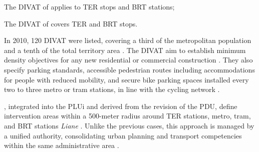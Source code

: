 \begin{refsegment}
{\begin{customitemize}
    \item The \acrshort{DIVAT} of  applies to  \acrshort{TER} stops and  \acrshort{BRT} stations;
    \item The \acrshort{DIVAT} of  covers  \acrshort{TER} and \acrshort{BRT} stops.
        \end{customitemize}
    In 2010, 120 \acrshort{DIVAT} were listed, covering a third of the metropolitan population and a tenth of the total territory area \textcolor{blue}{\autocite[18]{cerema_articuler_2010}}. The \acrshort{DIVAT} aim to establish minimum density objectives for any new residential or commercial construction \textcolor{blue}{\autocite[19]{lmcu_plan_2011}}. They also specify parking standards, accessible pedestrian routes including accommodations for people with reduced mobility, and secure bike parking spaces installed every two to three metro or tram stations, in line with the cycling network \textcolor{blue}{\autocite[19]{lmcu_plan_2011}}.
}, integrated into the \acrfull{PLUi} and derived from the revision of the \acrshort{PDU}, define intervention areas within a 500-meter radius around \acrshort{TER} stations, metro, tram, and \acrshort{BRT} stations \textsl{Liane} \textcolor{blue}{\autocites[19]{lmcu_plan_2011}[26]{meunier-chabert_contrats_2014}}. Unlike the previous cases, this approach is managed by a unified authority, consolidating urban planning and transport competencies within the same administrative area \textcolor{blue}{\autocite[3]{cerema_articuler_2010}}.%


\end{refsegment}

